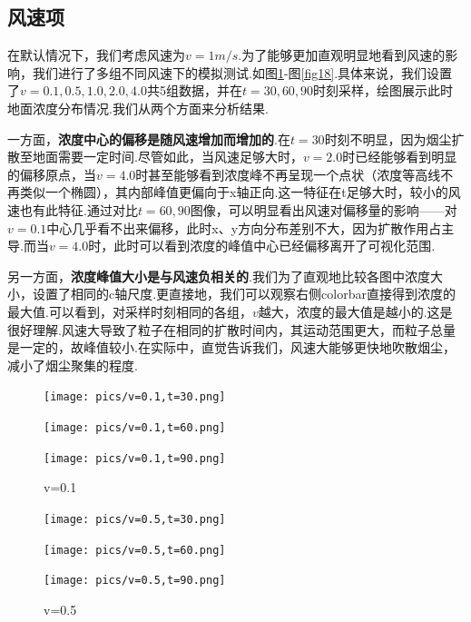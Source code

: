 \documentclass{article}
\begin{document}
	\subsection{风速项}
	在默认情况下，我们考虑风速为$v=1m/s$.为了能够更加直观明显地看到风速的影响，我们进行了多组不同风速下的模拟测试.如图\ref{fig14}-图\ref{fig18}.具体来说，我们设置了$v=0.1,0.5,1.0,2.0,4.0$共5组数据，并在$t=30,60,90$时刻采样，绘图展示此时地面浓度分布情况.我们从两个方面来分析结果.
	\par 一方面，\textbf{浓度中心的偏移是随风速增加而增加的}.在$t=30$时刻不明显，因为烟尘扩散至地面需要一定时间.尽管如此，当风速足够大时，$v=2.0$时已经能够看到明显的偏移原点，当$v=4.0$时甚至能够看到浓度峰不再呈现一个点状（浓度等高线不再类似一个椭圆），其内部峰值更偏向于x轴正向.这一特征在t足够大时，较小的风速也有此特征.通过对比$t=60,90$图像，可以明显看出风速对偏移量的影响——对$v=0.1$中心几乎看不出来偏移，此时x、y方向分布差别不大，因为扩散作用占主导.而当$v=4.0$时，此时可以看到浓度的峰值中心已经偏移离开了可视化范围.
	\par 另一方面，\textbf{浓度峰值大小是与风速负相关的}.我们为了直观地比较各图中浓度大小，设置了相同的c轴尺度.更直接地，我们可以观察右侧colorbar直接得到浓度的最大值.可以看到，对采样时刻相同的各组，$v$越大，浓度的最大值是越小的.这是很好理解.风速大导致了粒子在相同的扩散时间内，其运动范围更大，而粒子总量是一定的，故峰值较小.在实际中，直觉告诉我们，风速大能够更快地吹散烟尘，减小了烟尘聚集的程度.
	
	\begin{figure}[htbp]
		\begin{minipage}{0.33\textwidth}
			\texttt{[image: pics/v=0.1,t=30.png]}
		\end{minipage}
		\begin{minipage}{0.33\textwidth}
			\texttt{[image: pics/v=0.1,t=60.png]}
		\end{minipage}
		\begin{minipage}{0.33\textwidth}
			\texttt{[image: pics/v=0.1,t=90.png]}
		\end{minipage}
		\caption{v=0.1}
		\label{fig14}
	\end{figure}

	\begin{figure}[htbp]
		\begin{minipage}{0.33\textwidth}
			\texttt{[image: pics/v=0.5,t=30.png]}
		\end{minipage}
		\begin{minipage}{0.33\textwidth}
			\texttt{[image: pics/v=0.5,t=60.png]}
		\end{minipage}
		\begin{minipage}{0.33\textwidth}
			\texttt{[image: pics/v=0.5,t=90.png]}
		\end{minipage}
		\caption{v=0.5}
		\label{fig15}
	\end{figure}
\end{document}
